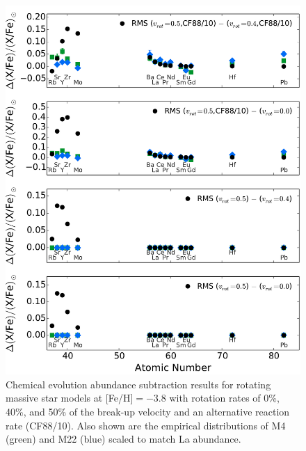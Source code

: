 \begin{figure}
 \begin{center}\includegraphics[width=\textwidth]{f5.pdf}\end{center}
 \caption{Chemical evolution abundance subtraction results for rotating massive star models at [Fe/H]$=-3.8$ with rotation rates of 0\%, 40\%, and 50\% of the break-up velocity and an alternative reaction rate (CF88/10). Also shown are the empirical distributions of M4 (green) and M22 (blue) scaled to match La abundance.}
 \label{fig:rmszm5results}
\end{figure}


